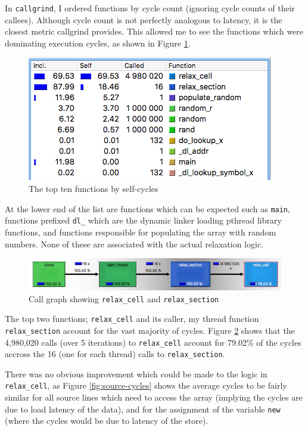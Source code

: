 \documentclass[12pt]{article}
\begin{document}
In \texttt{callgrind}, I ordered functions by cycle count (ignoring cycle counts of their callees). Although cycle count is not perfectly analogous to latency, it is the closest metric callgrind provides. This allowed me to see the functions which were dominating execution cycles, as shown in Figure \ref{fig:top-cycles}.
\begin{figure}[!htb]
\centering
\includegraphics[width=.5\textwidth]{img/top-ten.png}
\caption{The top ten functions by self-cycles}
\label{fig:top-cycles}
\end{figure}
At the lower end of the list are functions which can be expected such as \texttt{main}, functions prefixed \texttt{dl\_} which are the dynamic linker loading pthread library functions, and functions responsible for populating the array with random numbers. None of these are associated with the actual relaxation logic. 
\begin{figure}[!htb]
\hspace{-0.7cm}\includegraphics[width=1.1\textwidth]{img/cg.png}
\caption{Call graph showing \texttt{relax\_cell} and \texttt{relax\_section}}
\label{fig:cg}
\end{figure}
The top two functions; \texttt{relax\_cell} and its caller, my thread function \texttt{relax\_section} account for the vast majority of cycles. Figure \ref{fig:cg} shows that the 4,980,020 calls (over 5 iterations) to \texttt{relax\_cell} account for 79.02\% of the cycles accross the 16 (one for each thread) calls to  \texttt{relax\_section}.
\clearpage

There was no obvious improvement which could be made to the logic in \texttt{relax\_cell}, as Figure \ref{fig:source-cycles} shows the average cycles to be fairly similar for all source lines which need to access the array (implying the cycles are due to load latency of the data), and for the assignment of the variable \texttt{new} (where the cycles would be due to latency of the store).
\end{document}
